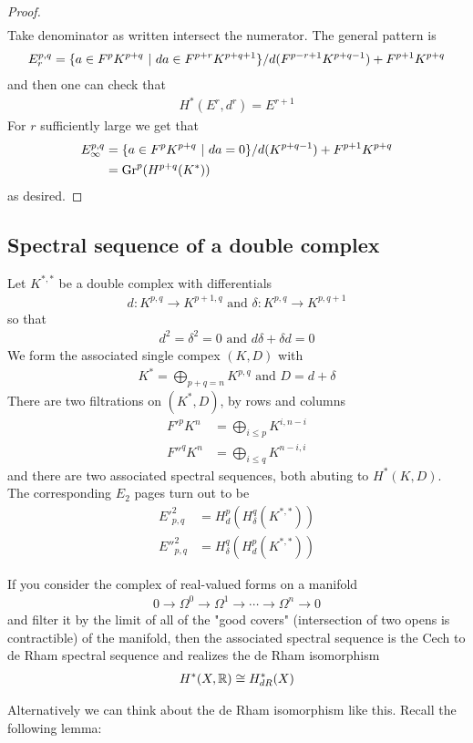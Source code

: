 \documentclass[12pt]{article}
\begin{document}
\begin{proof}
\begin{align*}
    \end{align*} Take denominator as written intersect the numerator. The general pattern is \begin{align*}
        E_r^{p,q} = \{a \in F^pK^{p+q} \ \vert \  da \in F^{p+r}K^{p+q+1}\} / d(F^{p-r+1}K^{p+q-1}) + F^{p+1}K^{p+q}
    \end{align*} and then one can check that \begin{align*}
        H^*(E^r,d^r) = E^{r+1}
    \end{align*} For $r$ sufficiently large we get that \begin{align*}
        E_\infty^{p,q} & = \{a\in F^pK^{p+q} \ \vert \  da = 0\} / d(K^{p+q-1}) + F^{p+1}K^{p+q} \\
                       & = \operatorname{Gr}^p(H^{p+q}(K^*))
    \end{align*} as desired.
\end{proof}
\subsection{Spectral sequence of a double complex}
Let $K^{*,*}$ be a double complex with differentials \begin{align*}
    d: K^{p,q} \to K^{p+1,q} \text{ and } \delta: K^{p,q} \to K^{p,q+1}
\end{align*} so that \begin{align*}
    d^2 = \delta^2 = 0 \text{ and } d\delta + \delta d = 0
\end{align*} We form the associated single compex $(K,D)$ with \begin{align*}
    K^* = \bigoplus_{p+q=n} K^{p,q} \text{ and } D = d + \delta
\end{align*}
There are two filtrations on $(K^*,D)$, by rows and columns \begin{align*}
    F'^pK^n  & = \bigoplus_{i\leq p} K^{i,n-i} \\
    F''^qK^n & = \bigoplus_{i\leq q} K^{n-i,i}
\end{align*} and there are two associated spectral sequences, both abuting to
$H^*(K,D)$. The corresponding $E_2$ pages turn out to be \begin{align*}
    E'^2_{p,q}  & = H^p_d(H^q_\delta(K^{*,*})) \\
    E''^2_{p,q} & = H^q_\delta(H^p_d(K^{*,*}))
\end{align*}
\begin{example}
    If you consider the complex of real-valued forms on a manifold \begin{align*}
        0 \to \Omega^0 \to \Omega^1 \to \cdots \to \Omega^n \to 0
    \end{align*} and filter it by the limit of all of the "good covers" (intersection
    of two opens is contractible) of the manifold,
    then the associated spectral sequence is the Cech to de Rham spectral sequence and
    realizes the de Rham isomorphism \begin{align*}
        H^*(X,\mathbb{R}) \cong H^*_{dR}(X)
    \end{align*}
\end{example}
Alternatively we can think about the de Rham isomorphism like this. Recall the
following lemma:
\end{document}
